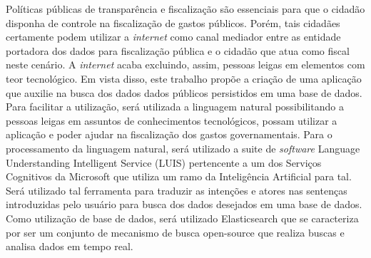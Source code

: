 Políticas públicas de transparência e fiscalização são essenciais para que o cidadão disponha de controle na fiscalização de gastos públicos. Porém, tais cidadães certamente podem utilizar a \textit{internet} como canal mediador entre as entidade portadora dos dados para fiscalização pública e o cidadão que atua como fiscal neste cenário. A \textit{internet} acaba excluindo, assim, pessoas leigas em elementos com teor tecnológico.
Em vista disso, este trabalho propõe a criação de uma aplicação que auxilie na busca dos dados dados públicos persistidos em uma base de dados. Para facilitar a utilização, será utilizada a linguagem natural possibilitando a pessoas leigas em assuntos de conhecimentos tecnológicos, possam utilizar a aplicação e poder ajudar na fiscalização dos gastos governamentais.
Para o processamento da linguagem natural, será utilizado a suite de \textit{software} Language Understanding Intelligent Service (LUIS) pertencente a um dos Serviços Cognitivos da Microsoft que utiliza um ramo da Inteligência Artificial para tal. Será utilizado tal ferramenta para traduzir as intenções e atores nas sentenças introduzidas pelo usuário para busca dos dados desejados em uma base de dados.
Como utilização de base de dados,  será utilizado Elasticsearch que se caracteriza por ser um conjunto de mecanismo de busca open-source que realiza buscas e analisa dados em tempo real.
